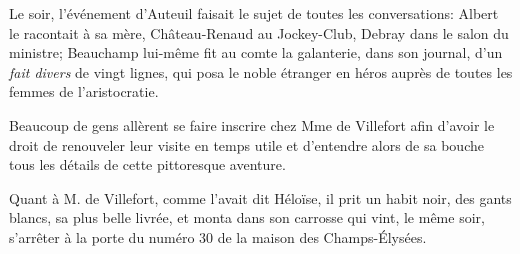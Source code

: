 Le soir, l'événement d'Auteuil faisait le sujet de toutes les conversations: Albert le racontait à sa mère, Château-Renaud au Jockey-Club, Debray dans le salon du ministre; Beauchamp lui-même fit au comte la galanterie, dans son journal, d'un \textit{fait divers} de vingt lignes, qui posa le noble étranger en héros auprès de toutes les femmes de l'aristocratie. 

Beaucoup de gens allèrent se faire inscrire chez Mme de Villefort afin d'avoir le droit de renouveler leur visite en temps utile et d'entendre alors de sa bouche tous les détails de cette pittoresque aventure.  

Quant à M. de Villefort, comme l'avait dit Héloïse, il prit un habit noir, des gants blancs, sa plus belle livrée, et monta dans son carrosse qui vint, le même soir, s'arrêter à la porte du numéro 30 de la maison des Champs-Élysées. 